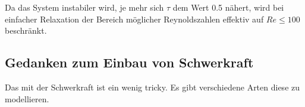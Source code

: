 \documentclass[a4paper,10pt]{scrreprt}
\begin{document}
Da das System instabiler wird, je mehr sich $\tau$ dem Wert \num{0.5} nähert, wird bei einfacher Relaxation der Bereich möglicher Reynoldszahlen effektiv auf $\mathit{Re} \leq \num{100}$ beschränkt.

























\subsection{Gedanken zum Einbau von Schwerkraft}
Das mit der Schwerkraft ist ein wenig tricky. Es gibt verschiedene Arten diese zu modellieren.
\end{document}
